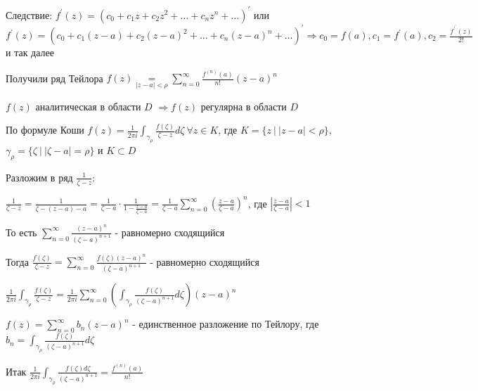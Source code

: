 \documentclass[12pt]{article}
\begin{document}
Следствие: $f^\prime(z) = (c_0 + c_1 z + c_2 z^2 + \dots + c_n z^n + \dots)^\prime$ или 
$f^\prime(z) = (c_0 + c_1 (z - a) + c_2 (z - a)^2 + \dots + c_n (z - a)^n + \dots)^\prime \Longrightarrow c_0 = f(a), c_1 = f^\prime(a), c_2 = \frac{f^\prime^\prime(z)}{2!}$ и так далее 

Получили ряд Тейлора $f(z) \underset{|z - a| < \rho}{=} \sum_{n = 0}^\infty \frac{f^{(n)} (a)}{n!} (z - a)^n$

\begin{MyTheorem}
    \Ths $f(z)$ аналитическая в области $D$ $\Longrightarrow f(z)$ регулярна в области $D$
\end{MyTheorem}

\begin{MyProof}
    По формуле Коши $f(z) = \frac{1}{2\pi i} \int_{\gamma_\rho} \frac{f(\zeta)}{\zeta - z} d\zeta \ \forall z \in K$, где $K = \{z \ | \ |z - a| < \rho\}$, $\gamma_\rho = \{ \zeta \ | \ |\zeta - a| = \rho\}$ и $K \subset D$

    Разложим в ряд $\frac{1}{\zeta - z}$:

    $\frac{1}{\zeta - z} = \frac{1}{\zeta - (z - a) - a} = \frac{1}{\zeta - a} \cdot \frac{1}{1 - \frac{z - a}{\zeta - a}} = \frac{1}{\zeta - a} \sum_{n = 0}^\infty \left(\frac{z - a}{\zeta - a}\right)^n$, где $\left|\frac{z - a}{\zeta - a}\right| < 1$

    То есть $\sum_{n = 0}^\infty \frac{(z - a)^n}{(\zeta - a)^{n + 1}}$ - равномерно сходящийся

    Тогда $\frac{f(\zeta)}{\zeta - z} = \sum_{n = 0}^\infty \frac{f(\zeta) (z - a)^n}{(\zeta - a)^{n + 1}}$ - равномерно сходящийся 

    $\frac{1}{2\pi i} \int_{\gamma_\rho} \frac{f(\zeta)}{\zeta - z} = \frac{1}{2\pi i} \sum_{n = 0}^\infty \left(\int_{\gamma_\rho} \frac{f(\zeta)}{(\zeta - a)^{n + 1}} d\zeta \right) (z - a)^n$

    $f(z) = \sum_{n = 0}^\infty b_n (z - a)^n$ - единственное разложение по Тейлору, где $b_n = \int_{\gamma_\rho} \frac{f(\zeta)}{(\zeta - a)^{n + 1}} d\zeta$

    Итак $\frac{1}{2\pi i} \int_{\gamma_\rho} \frac{f(\zeta) d\zeta}{(\zeta - a)^{n + 1}} = \frac{f^{(n)}(a)}{n!}$
\end{MyProof}


\end{document}
